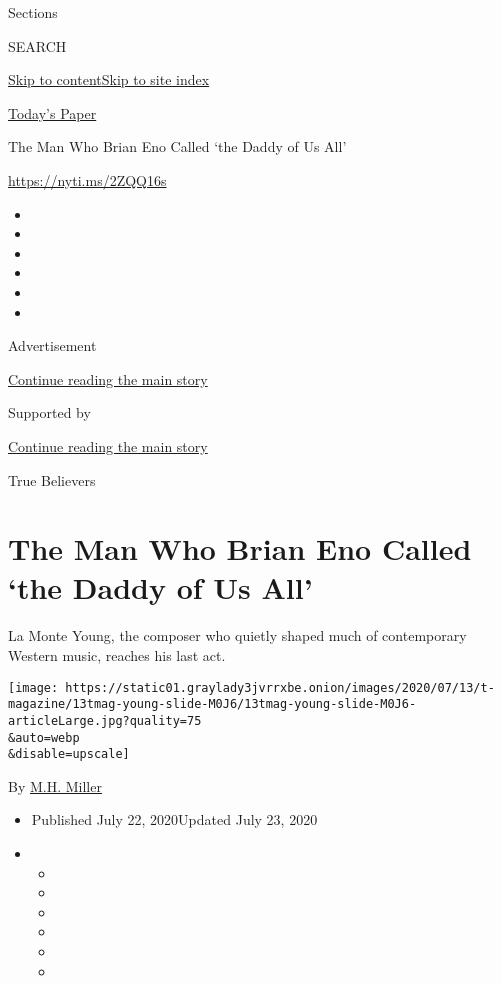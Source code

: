 Sections

SEARCH

\protect\hyperlink{site-content}{Skip to
content}\protect\hyperlink{site-index}{Skip to site index}

\href{https://myaccount.nytimes3xbfgragh.onion/auth/login?response_type=cookie\&client_id=vi}{}

\href{https://www.nytimes3xbfgragh.onion/section/todayspaper}{Today's
Paper}

The Man Who Brian Eno Called `the Daddy of Us All'

\url{https://nyti.ms/2ZQQ16s}

\begin{itemize}
\item
\item
\item
\item
\item
\item
\end{itemize}

Advertisement

\protect\hyperlink{after-top}{Continue reading the main story}

Supported by

\protect\hyperlink{after-sponsor}{Continue reading the main story}

True Believers

\hypertarget{the-man-who-brian-eno-called-the-daddy-of-us-all}{%
\section{The Man Who Brian Eno Called `the Daddy of Us
All'}\label{the-man-who-brian-eno-called-the-daddy-of-us-all}}

La Monte Young, the composer who quietly shaped much of contemporary
Western music, reaches his last act.

\texttt{[image: https://static01.graylady3jvrrxbe.onion/images/2020/07/13/t-magazine/13tmag-young-slide-M0J6/13tmag-young-slide-M0J6-articleLarge.jpg?quality=75\\\&auto=webp\\\&disable=upscale]}

By \href{https://www.nytimes3xbfgragh.onion/by/m-h-miller}{M.H. Miller}

\begin{itemize}
\item
  Published July 22, 2020Updated July 23, 2020
\item
  \begin{itemize}
  \item
  \item
  \item
  \item
  \item
  \item
  \end{itemize}
\end{itemize}

